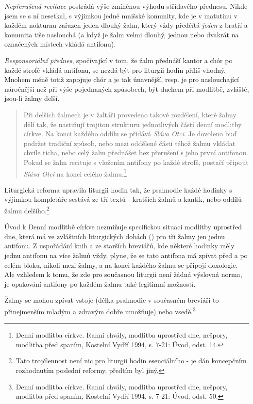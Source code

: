 \emph{Nepřerušená recitace} postrádá výše zmíněnou výhodu střídavého přednesu.
Nikde jsem se s ní nesetkal, s výjimkou jedné mnišské komunity, kde je
v matutinu v každém nokturnu zařazen jeden dlouhý žalm, který vždy předčítá
\emph{jeden} z bratří a komunita tiše naslouchá (a když je žalm velmi dlouhý, 
jednou nebo dvakrát na označených místech vkládá antifonu).

\emph{Responsoriální přednes}, spočívající v tom, že žalm přednáší kantor
a chór po každé strofě vkládá antifonu, se nezdá být pro liturgii hodin
příliš vhodný. Mnohem méně totiž zapojuje chór a je tak únavnější,
resp. je pro naslouchající náročnější než při výše pojednaných způsobech,
být duchem při modlitbě, zvláště, jsou-li žalmy delší.

\begin{quote}
Při delších žalmech je v žaltáři provedeno takové rozdělení, které žalmy
dělí tak, že nastiňují trojitou strukturu jednotlivých částí denní modlitby 
církve.
Na konci každého oddílu se přidává \emph{Sláva Otci}.
Je dovoleno buď podržet tradiční způsob, nebo mezi oddělené části téhož žalmu
vkládat chvíle ticha, nebo celý žalm přednášet bez přerušení s jeho první
antifonou. Pokud se žalm recituje s vložením antifony po každé strofě,
postačí připojit \emph{Sláva Otci} na konci celého žalmu.\footnote{Denní modlitba církve. Ranní chvály, modlitba uprostřed dne, nešpory, modlitba před spaním, Kostelní Vydří 1994, s. 7-21: Úvod, odst. 14.}
\end{quote}

Liturgická reforma upravila liturgii hodin tak, že psalmodie každé hodinky
s výjimkou kompletáře sestává ze tří textů - kratších žalmů a kantik, nebo
oddílů žalmu delšího.\footnote{Tato trojčlennost není nic pro liturgii hodin
esenciálního - je dán koncepčním rozhodnutím poslední reformy, předtím
byl jiný.}

Úvod k Denní modlitbě církve nezmiňuje specifickou situaci modlitby uprostřed 
dne, která má ve zvláštních liturgických dobách (\emph{})
pro tři žalmy jen jednu antifonu. Z uspořádání knih a ze starších breviářů,
kde některé hodinky měly jednu antifonu na více žalmů vždy, plyne,
že se tato antifona má zpívat před a po celém bloku, nikoli mezi žalmy,
a na konci každého žalmu se připojí doxologie. Ale vzhledem k tomu, že
zde pro současnou liturgii není žádná výslovná norma, je opakování antifony 
po každém žalmu také legitimní možností.

Žalmy se mohou zpívat vstoje (délka psalmodie v současném breviáři to
přinejmenším mladým a zdravým dobře umožňuje) nebo vsedě.\footnote{Denní modlitba církve. Ranní chvály, modlitba uprostřed dne, nešpory, modlitba před spaním, Kostelní Vydří 1994, s. 7-21: Úvod, odst. 50.}


